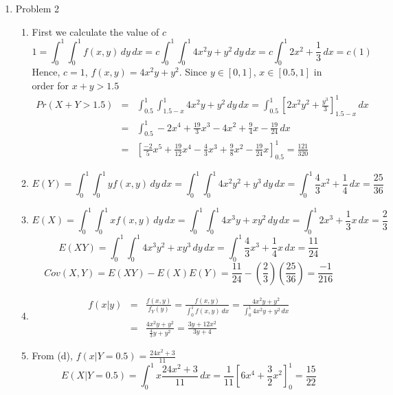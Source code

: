 \documentclass[leqno,12pt]{article}
\begin{document}
\begin{enumerate}
\item Problem 2
\begin{enumerate}
\item First we calculate the value of $c$
\[1=\int^{1}_{0}\int^{1}_{0}f(x,y)\,dy\,dx=c\int^{1}_{0}\int^{1}_{0}4x^2y+y^2\,dy\,dx=c\int^{1}_{0}2x^2+\frac{1}{3}\,dx=c(1)\]
Hence, $c=1$, $f(x,y)=4x^2y+y^2$. Since $y\in[0,1]$, $x\in[0.5,1]$ in order for $x+y>1.5$
\begin{eqnarray*}
Pr(X+Y>1.5)&=&\int^{1}_{0.5}\int^{1}_{1.5-x}4x^2y+y^2\,dy\,dx=\int^{1}_{0.5}\left[2x^2y^2+\frac{y^3}{3}\right]^{1}_{1.5-x}\,dx\\
&=&\int^{1}_{0.5}-2x^4+\frac{19}{3}x^3-4x^2+\frac{9}{4}x-\frac{19}{24}\,dx\\
&=&\left[\frac{-2}{5}x^5+\frac{19}{12}x^4-\frac{4}{3}x^3+\frac{9}{8}x^2-\frac{19}{24}x\right]^{1}_{0.5}=\frac{121}{320}
\end{eqnarray*}
\item \[E(Y)=\int^{1}_{0}\int^{1}_{0}yf(x,y)\,dy\,dx=\int^{1}_{0}\int^{1}_{0}4x^2y^2+y^3\,dy\,dx=\int^{1}_{0}\frac{4}{3}x^2+\frac{1}{4}\,dx=\frac{25}{36}\]
\item \[E(X)=\int^{1}_{0}\int^{1}_{0}xf(x,y)\,dy\,dx=\int^{1}_{0}\int^{1}_{0}4x^3y+xy^2\,dy\,dx=\int^{1}_{0}2x^3+\frac{1}{3}x\,dx=\frac{2}{3}\]
\[E(XY)=\int^{1}_{0}\int^{1}_{0}4x^3y^2+xy^3\,dy\,dx=\int^{1}_{0}\frac{4}{3}x^3+\frac{1}{4}x\,dx=\frac{11}{24}\]
\[Cov(X,Y)=E(XY)-E(X)E(Y)=\frac{11}{24}-\left(\frac{2}{3}\right)\left(\frac{25}{36}\right)=\frac{-1}{216}\]
\item \begin{eqnarray*}
f(x|y)&=&\frac{f(x,y)}{f_Y(y)}=\frac{f(x,y)}{\int^{1}_{0}f(x,y)\,dx}=\frac{4x^2y+y^2}{\int^{1}_{0}4x^2y+y^2\,dx}\\
&=&\frac{4x^2y+y^2}{\frac{4}{3}y+y^2}=\frac{3y+12x^2}{3y+4}
\end{eqnarray*}
\item From (d), $f(x|Y=0.5)=\frac{24x^2+3}{11}$
\[E(X|Y=0.5)=\int^{1}_{0}x\frac{24x^2+3}{11}\,dx=\frac{1}{11}\left[6x^4+\frac{3}{2}x^2\right]^{1}_{0}=\frac{15}{22}\]\\
\end{enumerate}

\pagebreak


\end{enumerate}
\end{document}
